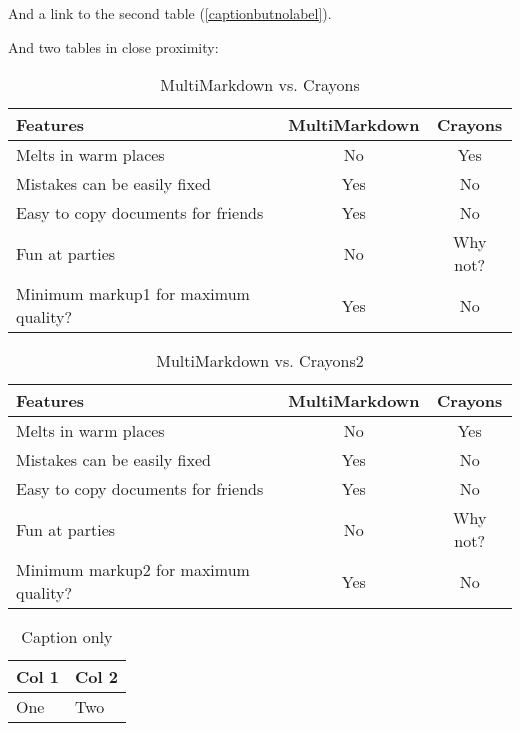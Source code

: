 And a link to the second table (\autoref{captionbutnolabel}).

And two tables in close proximity:

\begin{table}[htbp]
\begin{minipage}{\linewidth}
\setlength{\tymax}{0.5\linewidth}
\centering
\small
\caption{MultiMarkdown vs. Crayons}
\label{multimarkdownvs.crayons}
\begin{tabular}{@{}lcc@{}} \\ \toprule
Features&MultiMarkdown&Crayons\\
\midrule
Melts in warm places&No&Yes\\
Mistakes can be easily fixed&Yes&No\\
Easy to copy documents for friends&Yes&No\\
Fun at parties&No&Why not?\\

\midrule
Minimum markup1 for maximum quality?&Yes&No\\

\bottomrule

\end{tabular}
\end{minipage}
\end{table}


\begin{table}[htbp]
\begin{minipage}{\linewidth}
\setlength{\tymax}{0.5\linewidth}
\centering
\small
\caption{MultiMarkdown vs. Crayons2}
\label{multimarkdownvs.crayons2}
\begin{tabular}{@{}lcc@{}} \\ \toprule
Features&MultiMarkdown&Crayons\\
\midrule
Melts in warm places&No&Yes\\
Mistakes can be easily fixed&Yes&No\\
Easy to copy documents for friends&Yes&No\\
Fun at parties&No&Why not?\\

\midrule
Minimum markup2 for maximum quality?&Yes&No\\

\bottomrule

\end{tabular}
\end{minipage}
\end{table}


\begin{table}[htbp]
\begin{minipage}{\linewidth}
\setlength{\tymax}{0.5\linewidth}
\centering
\small
\caption{Caption only}
\label{captiononly}
\begin{tabular}{@{}ll@{}} \\ \toprule
Col 1&Col 2\\
\midrule
One&Two \\

\bottomrule

\end{tabular}
\end{minipage}
\end{table}





